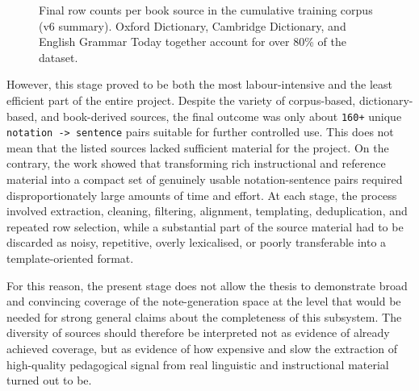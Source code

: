 \documentclass[12pt,a4paper,oneside]{report}
\begin{document}
\begin{figure}[H]
\centering
{}
\caption{Final row counts per book source in the cumulative training corpus (v6 summary). Oxford Dictionary, Cambridge Dictionary, and English Grammar Today together account for over 80\% of the dataset.}
\label{fig:datasetsources}
\end{figure}

However, this stage proved to be both the most labour-intensive and the least efficient part of the entire project. Despite the variety of corpus-based, dictionary-based, and book-derived sources, the final outcome was only about \texttt{160+} unique \texttt{notation -> sentence} pairs suitable for further controlled use. This does not mean that the listed sources lacked sufficient material for the project. On the contrary, the work showed that transforming rich instructional and reference material into a compact set of genuinely usable notation-sentence pairs required disproportionately large amounts of time and effort. At each stage, the process involved extraction, cleaning, filtering, alignment, templating, deduplication, and repeated row selection, while a substantial part of the source material had to be discarded as noisy, repetitive, overly lexicalised, or poorly transferable into a template-oriented format.

For this reason, the present stage does not allow the thesis to demonstrate broad and convincing coverage of the note-generation space at the level that would be needed for strong general claims about the completeness of this subsystem. The diversity of sources should therefore be interpreted not as evidence of already achieved coverage, but as evidence of how expensive and slow the extraction of high-quality pedagogical signal from real linguistic and instructional material turned out to be.
\end{document}
